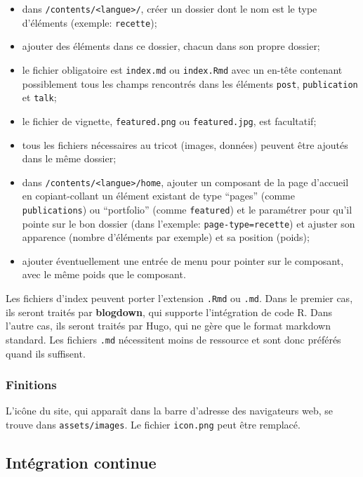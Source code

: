 \documentclass[
  12pt,
  french,
  a4paper,
  extrafontsizes,onecolumn,openright
  ]{memoir}
\providecommand{\tightlist}{%
  \setlength{\itemsep}{0pt}\setlength{\parskip}{0pt}}
\begin{document}
\begin{itemize}
\tightlist
\item
  dans \texttt{/contents/\textless{}langue\textgreater{}/}, créer un dossier dont le nom est le type d'éléments (exemple: \texttt{recette});
\item
  ajouter des éléments dans ce dossier, chacun dans son propre dossier;
\item
  le fichier obligatoire est \texttt{index.md} ou \texttt{index.Rmd} avec un en-tête contenant possiblement tous les champs rencontrés dans les éléments \texttt{post}, \texttt{publication} et \texttt{talk};
\item
  le fichier de vignette, \texttt{featured.png} ou \texttt{featured.jpg}, est facultatif;
\item
  tous les fichiers nécessaires au tricot (images, données) peuvent être ajoutés dans le même dossier;
\item
  dans \texttt{/contents/\textless{}langue\textgreater{}/home}, ajouter un composant de la page d'accueil en copiant-collant un élément existant de type \enquote{pages} (comme \texttt{publications}) ou \enquote{portfolio} (comme \texttt{featured}) et le paramétrer pour qu'il pointe sur le bon dossier (dans l'exemple: \texttt{page-type=recette}) et ajuster son apparence (nombre d'éléments par exemple) et sa position (poids);
\item
  ajouter éventuellement une entrée de menu pour pointer sur le composant, avec le même poids que le composant.
\end{itemize}

Les fichiers d'index peuvent porter l'extension \texttt{.Rmd} ou \texttt{.md}.
Dans le premier cas, ils seront traités par \textbf{blogdown}, qui supporte l'intégration de code R.
Dans l'autre cas, ils seront traités par Hugo, qui ne gère que le format markdown standard.
Les fichiers \texttt{.md} nécessitent moins de ressource et sont donc préférés quand ils suffisent.

\hypertarget{finitions-1}{%
\subsubsection{Finitions}\label{finitions-1}}

L'icône du site, qui apparaît dans la barre d'adresse des navigateurs web, se trouve dans \texttt{assets/images}.
Le fichier \texttt{icon.png} peut être remplacé.

\hypertarget{sec:rediger-web-ci}{%
\subsection{Intégration continue}\label{sec:rediger-web-ci}}
\end{document}
